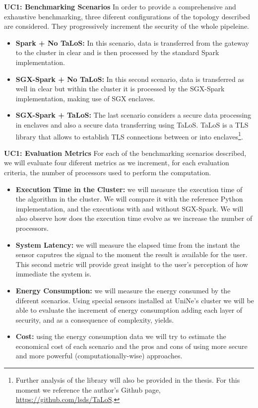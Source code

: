 \documentclass{article}
\begin{document}
\textbf{UC1: Benchmarking Scenarios}
In order to provide a comprehensive and exhaustive benchmarking, three diferent configurations of the topology described are considered. They progressively increment the security of the whole pipeleine.
\begin{itemize}
    \item \textbf{Spark + No TaLoS:} In this scenario, data is transferred from the gateway to the cluster in clear and is then processed by the standard Spark implementation.
    \item \textbf{SGX-Spark + No TaLoS:} In this second scenario, data is transferred as well in clear but within the cluster it is processed by the SGX-Spark implementation, making use of SGX enclaves.
    \item \textbf{SGX-Spark + TaLoS:} The last scenario considers a secure data processing in enclaves and also a secure data transferring using TaLoS. TaLoS is a TLS library that allows to establish TLS connections between or into enclaves\footnote{Further analysis of the library will also be provided in the thesis. For this moment we reference the author's Github page, \url{https://github.com/lsds/TaLoS}.}.
\end{itemize}

\textbf{UC1: Evaluation Metrics}
For each of the benchmarking scenarios described, we will evaluate four diferent metrics as we increment, for each evaluation criteria, the number of processors used to perform the computation.
\begin{itemize}
    \item \textbf{Execution Time in the Cluster:} we will measure the execution time of the algorithm in the cluster. We will compare it with the reference Python implementation, and the executions with and without SGX-Spark. We will also observe how does the execution time evolve as we increase the number of processors.
    \item \textbf{System Latency:} we will measure the elapsed time from the instant the sensor caputres the signal to the moment the result is available for the user. This second metric will provide great insight to the user's perception of how immediate the system is.
    \item \textbf{Energy Consumption:}  we will measure the energy consumed by the diferent scenarios. Using special sensors installed at UniNe's cluster we will be able to evaluate the increment of energy consumption adding each layer of security, and as a consequence of complexity, yields.
    \item \textbf{Cost:} using the energy consumption data we will try to estimate the economical cost of each scenario and the pros and cons of using more secure and more powerful (computationally-wise) approaches.
\end{itemize}
\end{document}
